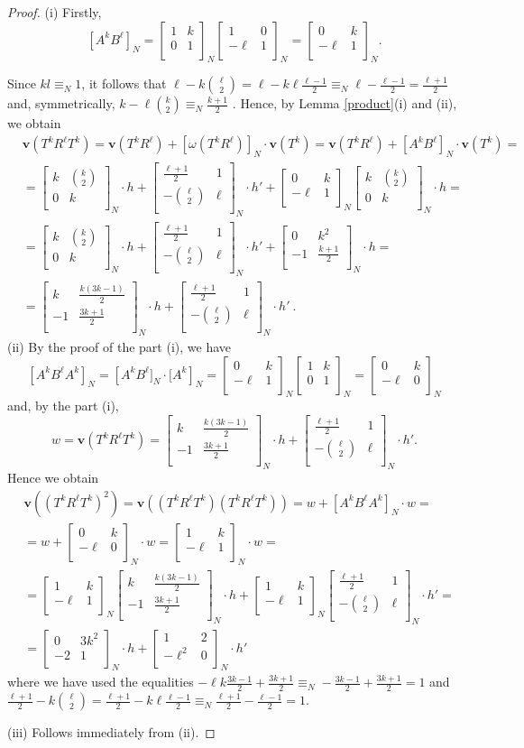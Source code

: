 \documentclass[10pt]{amsart}
\theoremstyle{plain}
\theoremstyle{definition}
\theoremstyle{remark}%
\newcommand{\f}{\mathbf{v}}
\newcommand{\g}{\omega}
\newcommand{\matN}[4]{\left[\begin{array}{cc}
 #1 & #2\\
 #3 & #4\\
\end{array}\right]_N}
\begin{document}
\begin{proof}
 (i) Firstly, $$\left[A^k B^{\ell}\right]_N=\matN{1}{k}{0}{1}\matN{1}{0}{-\ell}{1}=\matN{0}{k}{-\ell}{1}.$$
 
 
 Since $kl\equiv_{N}1$, it follows that $\ell-k{\ell\choose 2}=\ell-k\ell\frac{\ell-1}{2}\equiv_{N}\ell-\frac{\ell-1}{2}=\frac{\ell+1}{2}$ and, symmetrically, $k-\ell{k\choose 2}\equiv_{N}\frac{k+1}{2}$ . Hence, by Lemma \ref{product}(i) and (ii), we obtain
 \begin{align*}
 &\f(T^k R^\ell T^k)=\f(T^k R^\ell)+\left[\g(T^k R^{\ell})\right]_N \cdot\f(T^k)= \f(T^k R^\ell)+\left[A^k B^{\ell}\right]_N \cdot\f(T^k)=\\
 &=\matN{k}{{k\choose 2}}{0}{k}\cdot h+\matN{\frac{\ell+1}{2}}{1}{-{\ell\choose 2}}{\ell}\cdot h'+\matN{0}{k}{-\ell}{1}\matN{k}{{k\choose 2}}{0}{k}\cdot h=\\
 &=\matN{k}{{k\choose 2}}{0}{k}\cdot h+\matN{\frac{\ell+1}{2}}{1}{-{\ell\choose 2}}{\ell}\cdot h'+\matN{0}{k^2}{-1}{\frac{k+1}{2}}\cdot h=\\
  &=\matN{k}{\frac{k(3k-1)}{2}}{-1}{\frac{3k+1}{2}}\cdot h+\matN{\frac{\ell+1}{2}}{1}{-{\ell\choose 2}}{\ell}\cdot h'\ .
  \end{align*}
  (ii) By the proof of the part (i), we have $$\left[A^k B^{\ell}A^k\right]_N=\left[A^k B^{\ell}]_{N}\cdot[A^k\right]_N=\matN{0}{k}{-\ell}{1}\matN{1}{k}{0}{1}=\matN{0}{k}{-\ell}{0}$$
  and,  by the part (i), $$w=\f(T^k R^{\ell}T^k)=\matN{k}{\frac{k(3k-1)}{2}}{-1}{\frac{3k+1}{2}}\cdot h+\matN{\frac{\ell+1}{2}}{1}{-{\ell\choose 2}}{\ell}\cdot h'.$$
  Hence we obtain
  \begin{align*}
  &\f((T^k R^{\ell}T^k)^2)=\f((T^k R^{\ell}T^k)(T^k R^{\ell}T^k))=w+[A^k B^{\ell}A^k]_N\cdot w=\\
  &=w+\matN{0}{k}{-\ell}{0}\cdot w=\matN{1}{k}{-\ell}{1}\cdot w=\\
  &=\matN{1}{k}{-\ell}{1}\matN{k}{\frac{k(3k-1)}{2}}{-1}{\frac{3k+1}{2}}\cdot h+\matN{1}{k}{-\ell}{1}\matN{\frac{\ell+1}{2}}{1}{-{\ell\choose 2}}{\ell}\cdot h'=\\
  &=\matN{0}{3k^2}{-2}{1}\cdot h+\matN{1}{2}{-\ell^2}{0}\cdot h'
  \end{align*}
where we have used the equalities $-\ell k\frac{3k-1}{2}+\frac{3k+1}{2}\equiv_N-\frac{3k-1}{2}+\frac{3k+1}{2}=1$ and
$\frac{\ell+1}{2}-k{\ell\choose 2}=\frac{\ell+1}{2}-k\ell\frac{\ell-1}{2}\equiv_{N}\frac{\ell+1}{2}-\frac{\ell-1}{2}=1$.

(iii) Follows immediately from (ii).


\end{proof}
\end{document}
